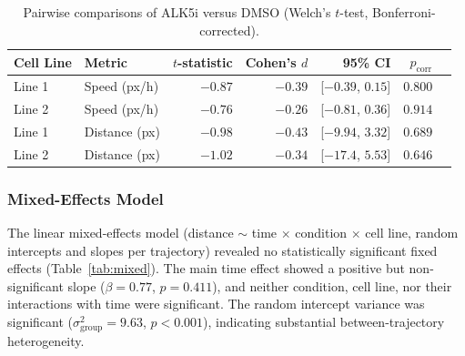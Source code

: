 \begin{table}[t]
  \centering
  \caption{Pairwise comparisons of ALK5i versus DMSO (Welch's $t$-test, Bonferroni-corrected).}\label{tab:pairwise}
  \begin{tabular}{llrrrrr}
    \toprule
    Cell Line & Metric & $t$-statistic & Cohen's $d$ & 95\% CI & $p_\text{corr}$ \\
    \midrule
    Line 1 & Speed (px/h)  & $-0.87$ & $-0.39$ & [$-0.39$, $0.15$] & $0.800$ \\
    Line 2 & Speed (px/h)  & $-0.76$ & $-0.26$ & [$-0.81$, $0.36$] & $0.914$ \\
    \addlinespace
    Line 1 & Distance (px) & $-0.98$ & $-0.43$ & [$-9.94$, $3.32$] & $0.689$ \\
    Line 2 & Distance (px) & $-1.02$ & $-0.34$ & [$-17.4$, $5.53$] & $0.646$ \\
    \bottomrule
  \end{tabular}
\end{table}

\subsubsection{Mixed-Effects Model}

The linear mixed-effects model (distance $\sim$ time $\times$ condition $\times$ cell line, random intercepts and slopes per trajectory) revealed no statistically significant fixed effects (Table~\ref{tab:mixed}). The main time effect showed a positive but non-significant slope ($\beta = 0.77$, $p = 0.411$), and neither condition, cell line, nor their interactions with time were significant. The random intercept variance was significant ($\sigma^2_\text{group} = 9.63$, $p < 0.001$), indicating substantial between-trajectory heterogeneity.

